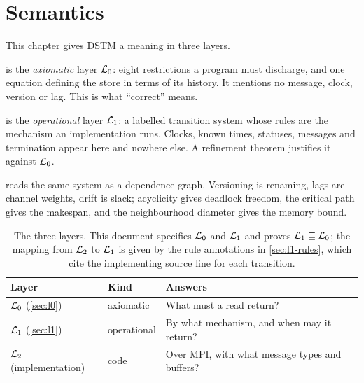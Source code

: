 \chapter{Semantics}
\label{ch:semantics}

This chapter gives DSTM a meaning in three layers.

 is the \emph{axiomatic} layer $\mathcal{L}_0$: eight restrictions a
program must discharge, and one equation defining the store in terms of its
\gls{history}. It mentions no message, clock, version or lag. This is
what ``correct'' means.

 is the \emph{operational} layer $\mathcal{L}_1$: a labelled transition
system whose rules are the mechanism an implementation runs. Clocks, known
times, statuses, messages and termination appear here and nowhere else. A
refinement theorem justifies it against $\mathcal{L}_0$.

 reads the same system as a dependence graph. Versioning is
renaming, lags are channel weights, drift is slack; acyclicity gives
deadlock freedom, the critical path gives the makespan, and the neighbourhood
diameter gives the memory bound.

\begin{table}[htbp]
\centering
\small
\begin{tabularx}{\textwidth}{@{}l l >{\raggedright\arraybackslash}X@{}}
\toprule
\textbf{Layer} & \textbf{Kind} & \textbf{Answers} \\
\midrule
$\mathcal{L}_0$ (\cref{sec:l0})   & axiomatic   & What must a read return? \\
$\mathcal{L}_1$ (\cref{sec:l1})   & operational & By what mechanism, and when may it return? \\
$\mathcal{L}_2$ (implementation)  & code        & Over MPI, with what message types and buffers? \\
\bottomrule
\end{tabularx}
\caption{The three layers. This document specifies $\mathcal{L}_0$ and $\mathcal{L}_1$ and
proves $\mathcal{L}_1 \sqsubseteq \mathcal{L}_0$; the mapping from $\mathcal{L}_2$ to $\mathcal{L}_1$ is given by the
rule annotations in \cref{sec:l1-rules}, which cite the implementing source
line for each transition.}
\label{tab:layers}
\end{table}




